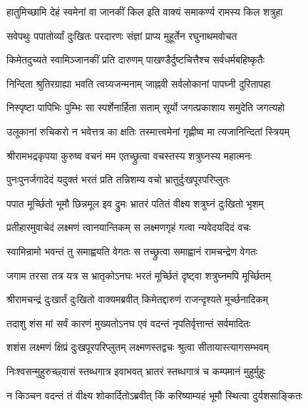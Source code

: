 \twolineshloka
{हातुमिच्छामि देहं स्वमेनां वा जानकीं किल}
{इति वाक्यं समाकर्ण्य रामस्य किल शत्रुहा}%

\twolineshloka
{सवेपथुः पपातोर्व्यां दुःखितः परदारणः}
{संज्ञां प्राप्य मुहूर्तेन रघुनाथमवोचत}%


\twolineshloka
{किमेतदुच्यते स्वामिञ्जानकीं प्रति दारुणम्}
{पाखण्डैर्दुष्टचित्तैश्च सर्वधर्मबहिष्कृतैः}%

\twolineshloka
{निन्दिता श्रुतिरग्राह्या भवति त्वग्र्यजन्मनाम्}
{जाह्नवी सर्वलोकानां पापघ्नी दुरितापहा}%

\twolineshloka
{निस्पृष्टा पापिभिः पुम्भिः सा स्पर्शेनार्हिता सताम्}
{सूर्यो जगत्प्रकाशाय समुदेति जगत्यहो}%

\twolineshloka
{उलूकानां रुचिकरो न भवेत्तत्र का क्षतिः}
{तस्मात्त्वमेनां गृह्णीष्व मा त्यजानिन्दितां स्त्रियम्}%

\twolineshloka
{श्रीरामभद्रकृपया कुरुष्व वचनं मम}
{एतच्छ्रुत्वा वचस्तस्य शत्रुघ्नस्य महात्मनः}%

\twolineshloka
{पुनःपुनर्जगादेदं यदुक्तं भरतं प्रति}
{तन्निशम्य वचो भ्रातुर्दुःखपूरपरिप्लुतः}%

\twolineshloka
{पपात मूर्च्छितो भूमौ छिन्नमूल इव द्रुमः}
{भ्रातरं पतितं वीक्ष्य शत्रुघ्नं दुःखितो भृशम्}%

\twolineshloka
{प्रतीहारमुवाचेदं लक्ष्मणं त्वानयान्तिकम्}
{स लक्ष्मणगृहं गत्वा न्यवेदयदिदं वचः}%


\twolineshloka
{स्वामिन्रामो भवन्तं तु समाह्वयति वेगतः}
{स तच्छ्रुत्वा समाह्वानं रामचन्द्रेण वेगतः}%

\twolineshloka
{जगाम तरसा तत्र यत्र स भ्रातृकोऽनघः}
{भरतं मूर्च्छितं दृष्ट्वा शत्रुघ्नमपि मूर्च्छितम्}%

\twolineshloka
{श्रीरामचन्द्रं दुःखार्तं दुःखितो वाक्यमब्रवीत्}
{किमेतद्दारुणं राजन्दृश्यते मूर्च्छनादिकम्}%

\twolineshloka
{तदाशु शंस मां सर्वं कारणं मुख्यतोऽनघ}
{एवं वदन्तं नृपतिर्वृत्तान्तं सर्वमादितः}%

\twolineshloka
{शशंस लक्ष्मणं क्षिप्रं दुःखपूरपरिप्लुतम्}
{लक्ष्मणस्तद्वचः श्रुत्वा सीतायास्त्यागसम्भवम्}%

\twolineshloka
{निःश्वसन्मुहुरुच्छ्वासं स्तब्धगात्र इवाभवत्}
{भ्रातरं स्तब्धगात्रं च कम्पमानं मुहुर्मुहुः}%

\twolineshloka
{न किञ्चन वदन्तं तं वीक्ष्य शोकार्दितोऽब्रवीत्}
{किं करिष्याम्यहं भूमौ स्थित्वा दुर्यशसाङ्कितः}%

